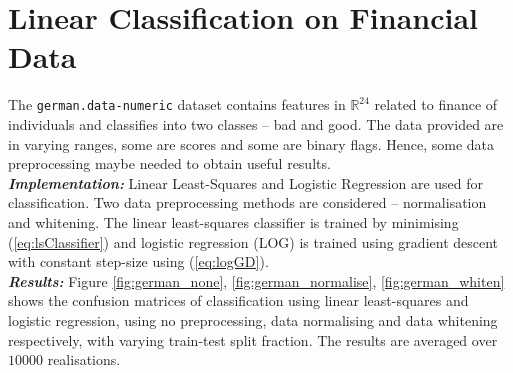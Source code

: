 \documentclass[12pt, a4 paper]{article}
\newcommand{\rr}{\mathbb{R}}
\begin{document}

\section{Linear Classification on Financial Data}
\label{sec:german}

The \texttt{german.data-numeric} dataset contains features in $\rr^{24}$ related to finance of individuals and classifies into two classes -- bad and good. The data provided are in varying ranges, some are scores and some are binary flags. Hence, some data preprocessing maybe needed to obtain useful results. \\

{\it \bfseries Implementation:} Linear Least-Squares and Logistic Regression are used for classification. Two data preprocessing methods are considered -- normalisation and whitening. The linear least-squares classifier is trained by minimising (\ref{eq:lsClassifier}) and logistic regression (LOG) is trained using gradient descent with constant step-size using (\ref{eq:logGD}). \\

{\it \bfseries Results:} Figure \ref{fig:german_none}, \ref{fig:german_normalise}, \ref{fig:german_whiten} shows the confusion matrices of classification using linear least-squares and logistic regression, using no preprocessing, data normalising and data whitening respectively, with varying train-test split fraction. The results are averaged over $10000$ realisations. \\
\end{document}
